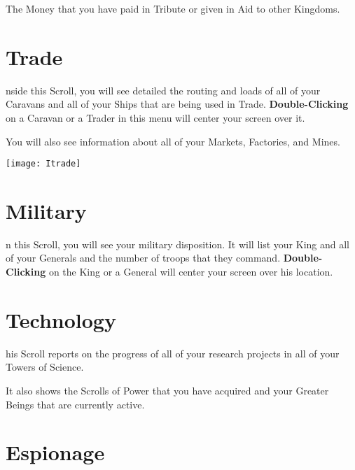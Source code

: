 {The Money that you have paid in Tribute or given in Aid to other Kingdoms.

\section{\textsf{Trade}}



nside this Scroll, you will see detailed the routing and loads of all of your Caravans and all of your Ships that are being used in Trade. \textbf{Double-Clicking} on a Caravan or a Trader in this menu will center your screen over it.

You will also see information about all of your Markets, Factories, and Mines.

\begin{center}
	\texttt{[image: Itrade]}
\end{center}

\section{\textsf{Military}}


n this Scroll, you will see your military disposition. It will list your King and all of your Generals and the number of troops that they command. \textbf{Double-Clicking} on the King or a General will center your screen over his location.

\section{\textsf{Technology}}


his Scroll reports on the progress of all of your research projects in all of your Towers of Science.

It also shows the Scrolls of Power that you have acquired and your Greater Beings that are currently active.

\section{\textsf{Espionage}}



}

